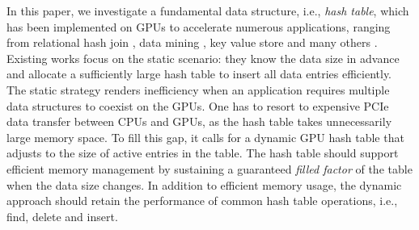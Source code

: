 In this paper, we investigate a fundamental data structure, i.e., \emph{hash table}, which has been implemented on GPUs to accelerate numerous applications, ranging from relational hash join \cite{he2008relational,he2009relational,heimel2013hardware}, data mining \cite{pan2011fast,zhou2010parallel,zhong2014medusa},  key value store \cite{zhang2015mega,hetherington2015memcachedgpu,breslow2016horton} and many others \cite{bowers2010parallel,pan2010efficient,garcia2011coherent,niessner2013real,wu2015gpu}. Existing works \cite{alcantara2009real,zhang2015mega,hong2010mapcg,hetherington2015memcachedgpu,breslow2016horton} focus on the static scenario: they know the data size in advance and allocate a sufficiently large hash table to insert all data entries efficiently. 
The static strategy renders inefficiency when an application requires multiple data structures to coexist on the GPUs. One has to resort to expensive PCIe data transfer between CPUs and GPUs, as the hash table takes unnecessarily large memory space. 
To fill this gap, it calls for a dynamic GPU hash table that adjusts to the size of active entries in the table. 
The hash table should support efficient memory management by sustaining a guaranteed \emph{filled factor} of the table when the data size changes. 
In addition to efficient memory usage, the dynamic approach should retain the performance of common hash table operations, i.e., find, delete and insert.


